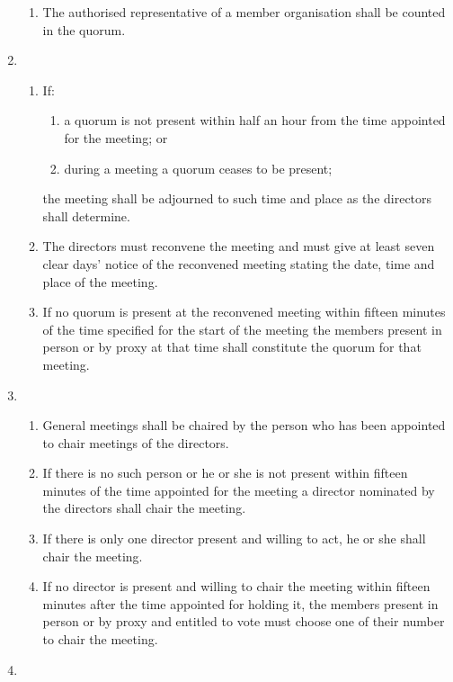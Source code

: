 \documentclass{article}
\begin{document}
\begin{enumerate}[label=\arabic*]
\begin{enumerate}[label=(\arabic*)]
        \item The authorised representative of a member organisation shall
        be counted in the quorum.
    \end{enumerate}
    \item \begin{enumerate}[label=(\arabic*)]
        \item If:
        \begin{enumerate}[label=(\alph*)]
            \item a quorum is not present within half an hour from the time
            appointed for the meeting; or
            \item during a meeting a quorum ceases to be present;
        \end{enumerate}
        the meeting shall be adjourned to such time and place as the
        directors shall determine.
        \item The directors must reconvene the meeting and must give at
        least seven clear days’ notice of the reconvened meeting stating
        the date, time and place of the meeting.
        \item If no quorum is present at the reconvened meeting within
        fifteen minutes of the time specified for the start of the meeting
        the members present in person or by proxy at that time shall
        constitute the quorum for that meeting.
    \end{enumerate}
    \item \begin{enumerate}[label=(\arabic*)]
        \item General meetings shall be chaired by the person who has been
        appointed to chair meetings of the directors.
        \item If there is no such person or he or she is not present within
        fifteen minutes of the time appointed for the meeting a director
        nominated by the directors shall chair the meeting.
        \item If there is only one director present and willing to act, he or she
        shall chair the meeting.
        \item If no director is present and willing to chair the meeting within
        fifteen minutes after the time appointed for holding it, the
        members present in person or by proxy and entitled to vote
        must choose one of their number to chair the meeting.
    \end{enumerate}
    \item \begin{enumerate}[label=(\arabic*)]

\end{enumerate}
\end{enumerate}
\end{document}
